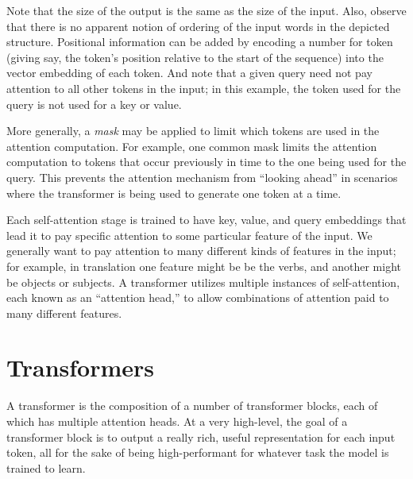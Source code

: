Note that the size of the output is the same as the size of the input.  Also, observe that there is no apparent notion of ordering of the input words in the depicted structure.  Positional information can be added by encoding a number for token (giving say, the token's position relative to the start of the sequence) into the vector embedding of each token.  And note that a given query need not pay attention to all other tokens in the input; in this example, the token used for the query is not used for a key or value.

More generally, a {\em mask} may be applied to limit which tokens are used in the attention computation.  For example, one common mask limits the attention computation to tokens that occur previously in time to the one being used for the query.  This prevents the attention mechanism from ``looking ahead'' in scenarios where the transformer is being used to generate one token at a time.


Each self-attention stage is trained to have key, value, and query embeddings that lead it to pay specific attention to some particular feature of the input.  We generally want to pay attention to many different kinds of features in the input; for example, in translation one feature might be be the verbs, and another might be objects or subjects.  A transformer utilizes multiple instances of self-attention, each known as an ``attention head,'' to allow combinations of attention paid to many different features.


\section{Transformers}
\label{sec-transformers}
A transformer is the composition of a number of transformer blocks, each of which has multiple attention heads. At a very high-level, the goal of a transformer block is to output a really rich, useful representation for each input token, all for the sake of being high-performant for whatever task the model is trained to learn.

